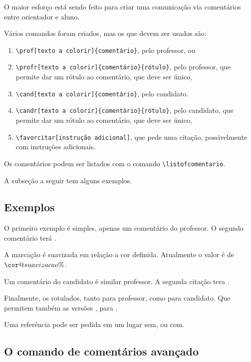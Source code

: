 \documentclass{article}
\begin{document}
O maior esforço está sendo feito para criar uma comunicação via comentários entre orientador e aluno. 

Vários comandos foram criados, mas os que devem ser usados são:
\begin{enumerate}
\item \verb!\prof[texto a colorir]{comentário}!, pelo professor, ou
\item \verb!\profr[texto a colorir]{comentário}{rótulo}!, pelo professor, que permite dar um rótulo ao comentário, que deve ser único, 
\item \verb!\cand[texto a colorir]{comentário}!, pelo candidato.
\item \verb!\candr[texto a colorir]{comentário}{rótulo}!, pelo candidato, que permite dar um rótulo ao comentário, que deve ser único, 
\item \verb!\favorcitar[instrução adicional]!, que pede uma citação, possivelmente com instruções adicionais.
\end{enumerate}

Os comentários podem ser listados com o comando \verb!\listofcomentario!.

A subseção a seguir  tem alguns exemplos.

\subsection{Exemplos}

O primeiro exemplo é simples, apenas um comentário do professor. O segundo comentário terá . 

A marcação é suavizada em relação a cor definida. Atualmente o valor é de \makeatletter$\cor@suavizacao\%$\makeatother.

Um comentário do candidato é similar professor. A segunda citação tera .

Finalmente, os rotulados, tanto para professor, como para candidato. Que permitem também as versões , para .

Uma referência pode ser pedida em um lugar sem\favorcitar, ou com\favorcitar[o experimento].

\subsection{O comando de comentários avançado}
\end{document}
